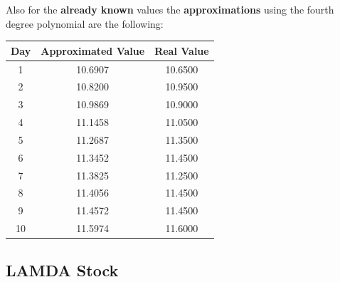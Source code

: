 \documentclass{article}
\begin{document}
\begin{itemize}
Also for the \textbf{already known} values the \textbf{approximations} using the fourth degree polynomial are the following:
\begin{center}
    
    \begin{tabular}{@{}ccc@{}}
        \toprule
        \textbf{Day} & \textbf{Approximated Value} & \textbf{Real Value} \\ \midrule
        1 & 10.6907 & 10.6500 \\
        2 & 10.8200 & 10.9500 \\
        3 & 10.9869 & 10.9000 \\
        4 & 11.1458 & 11.0500 \\
        5 & 11.2687 & 11.3500 \\
        6 & 11.3452 & 11.4500 \\
        7 & 11.3825 & 11.2500 \\
        8 & 11.4056 & 11.4500 \\
        9 & 11.4572 & 11.4500 \\
        10 & 11.5974 & 11.6000 \\
        \bottomrule
    \end{tabular}

    \end{center}
\end{itemize}
\newpage
\subsection{LAMDA Stock}
\end{document}
